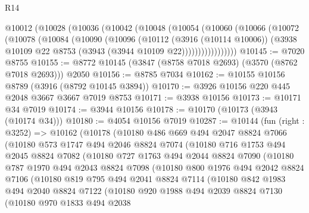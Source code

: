 \begin{lexlean}{R14}
\begin{coremodule}
    @10012
      (@10028
        (@10036
          (@10042
            (@10048
              (@10054
                (@10060
                  (@10066
                    (@10072
                      (@10078
                        (@10084
                          (@10090
                            (@10096
                              (@10112
                                (@3916 (@10114 @10006))
                                (@3938 @10109 @22 @8753 (@3943 (@3944 @10109 @22)))))))))))))))))
@10145 := @7020 @8755
@10155 := @8772 @10145 (@3847 (@8758 @7018 @2693) (@3570 (@8762 @7018 @2693))) @2050
@10156 := @8785 @7034
@10162 := @10155 @10156 @8789 (@3916 (@8792 @10145 @3894))
@10170 := @3926 @10156 @220 @445 @2048 @3667 @3667 @7019 @8753
@10171 := @3938 @10156
@10173 := @10171 @34 @7019
@10174 := @3944 @10156
@10178 := @10170 (@10173 (@3943 (@10174 @34)))
@10180 := @4054 @10156 @7019
@10287 := @10144
    (fun (right : @3252) =>
    @10162
      (@10178
        (@10180
          @486
          @669
          @494
          @2047
          @8824
          @7066
          (@10180
            @573
            @1747
            @494
            @2046
            @8824
            @7074
            (@10180
              @716
              @1753
              @494
              @2045
              @8824
              @7082
              (@10180
                @727
                @1763
                @494
                @2044
                @8824
                @7090
                (@10180
                  @787
                  @1970
                  @494
                  @2043
                  @8824
                  @7098
                  (@10180
                    @800
                    @1976
                    @494
                    @2042
                    @8824
                    @7106
                    (@10180
                      @819
                      @795
                      @494
                      @2041
                      @8824
                      @7114
                      (@10180
                        @842
                        @1983
                        @494
                        @2040
                        @8824
                        @7122
                        (@10180
                          @920
                          @1988
                          @494
                          @2039
                          @8824
                          @7130
                          (@10180
                            @970
                            @1833
                            @494
                            @2038

\end{coremodule}
\end{lexlean}
